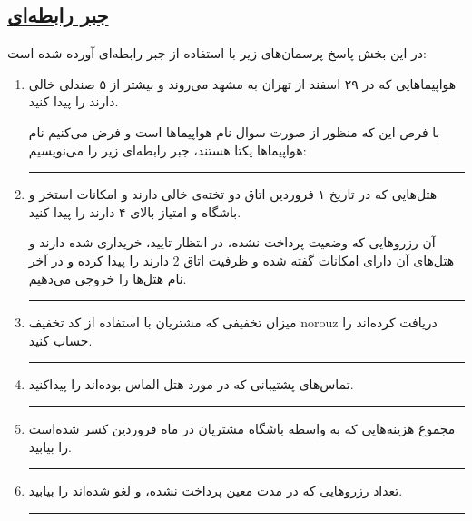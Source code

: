 \subsection*{\underline{جبر رابطه‌ای}}

در این بخش پاسخ پرسمان‌های زیر با استفاده از جبر رابطه‌ای آورده شده است:

\begin{enumerate}
	\item
	‌هواپیماهایی که در ۲۹ اسفند از تهران به مشهد می‌روند و بیشتر از ۵ صندلی خالی دارند را پیدا کنید.
	
	با ‌فرض این‌ که منظور از صورت سوال نام هواپیماها است و فرض می‌کنیم نام هواپیماها یکتا هستند، \linebreak جبر رابطه‌ای زیر را می‌نویسیم:
	
	
	\rule{\linewidth}{0.05mm}
	
	\item
	هتل‌هایی که در تاریخ ۱ فروردین اتاق دو تخته‌ی خالی دارند و امکانات استخر و باشگاه و \linebreak امتیاز بالای ۴ دارند را پیدا کنید.
	
آن رزروهایی که وضعیت پرداخت نشده، در انتظار تایید، خریداری شده دارند و هتل‌های آن دارای امکانات گفته شده و ظرفیت اتاق 2 دارند را پیدا کرده و در آخر نام هتل‌ها را خروجی می‌دهیم.
	
	
	\rule{\linewidth}{0.05mm}
	
	
	\item
	میزان تخفیفی که مشتریان با استفاده از کد تخفیف  norouz  دریافت کرده‌اند را حساب کنید.
	
	
	\rule{\linewidth}{0.05mm}
	
	
	\item
	تماس‌های پشتیبانی که در مورد هتل الماس بوده‌اند را پیداکنید.
	
	
	\rule{\linewidth}{0.05mm}	 
	
	
	
	
	\item
	مجموع هزینه‌هایی که‌ به واسطه باشگاه مشتریان در ماه فروردین کسر شده‌است را بیابید.
	
	
	\rule{\linewidth}{0.05mm}
	
	
	\item
	تعداد رزروهایی که در مدت معین پرداخت نشده، و لغو شده‌اند را بیابید.
	
	
	\rule{\linewidth}{0.05mm}
	

\end{enumerate}
